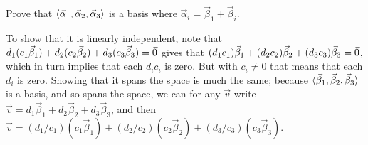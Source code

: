\begin{exercises}
\begin{exparts}
      \partsitem Prove that
        \( \langle\vec{\alpha}_1,\vec{\alpha}_2,\vec{\alpha}_3\rangle \)
        is a basis where \( \vec{\alpha}_i=\vec{\beta}_1+\vec{\beta}_i \).
    \end{exparts}
    \begin{answer}
      \begin{exparts}
         \partsitem To show that it is linearly independent, note that
           \( d_1(c_1\vec{\beta}_1)+d_2(c_2\vec{\beta}_2)+d_3(c_3\vec{\beta}_3)
               =\vec{0} \)
           gives that
           \( (d_1c_1)\vec{\beta}_1+(d_2c_2)\vec{\beta}_2+(d_3c_3)\vec{\beta}_3
               =\vec{0} \), which in turn 
           implies that each \( d_ic_i \) is zero.
           But with \( c_i\neq 0 \) that means that each \( d_i \) is zero.
           Showing that it spans the space is much the same; 
           because $\langle\vec{\beta}_1,\vec{\beta}_2,\vec{\beta}_3\rangle$
           is a basis, and so spans the space, we can for any $\vec{v}$ write  
           \( \vec{v}=d_1\vec{\beta}_1+d_2\vec{\beta}_2+d_3\vec{\beta}_3 \),
           and then
           \( \vec{v}=(d_1/c_1)(c_1\vec{\beta}_1)
               +(d_2/c_2)(c_2\vec{\beta}_2)+(d_3/c_3)(c_3\vec{\beta}_3) \).


\end{exparts}
\end{answer}
\end{exercises}
